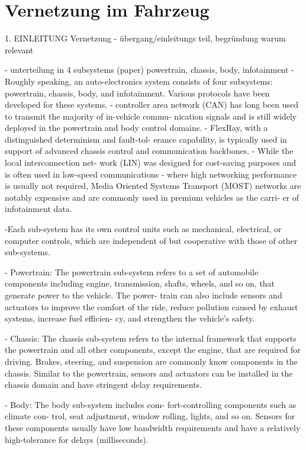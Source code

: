 \section{Vernetzung im Fahrzeug}

1. EINLEITUNG Vernetzung
- übergang/einleitungs teil, begründung warum relevant

- unterteilung in 4 subsystems (paper) powertrain, chassis, body, infotainment
- Roughly speaking, an auto-electronics system
consists of four subsystems: powertrain, chassis,
body, and infotainment. Various protocols have
been developed for these systems.
- controller area network (CAN) has long been
used to transmit the majority of in-vehicle commu-
nication signals and is still widely deployed in the
powertrain and body control domains.
- FlexRay, with a distinguished determinism and fault-tol-
erance capability, is typically used in support of
advanced chassis control and communication
backbones.
- While the local interconnection net-
work (LIN) was designed for cost-saving purposes
and is often used in low-speed communications
- where high networking performance is usually
not required, Media Oriented Systems Transport
(MOST) networks are notably expensive and are
commonly used in premium vehicles as the carri-
er of infotainment data.

-Each sub-system has its own control units such
as mechanical, electrical, or computer controls,
which are independent of but cooperative with
those of other sub-systems.

- Powertrain: The powertrain sub-system refers
to a set of automobile components including
engine, transmission, shafts, wheels, and so on,
that generate power to the vehicle. The power-
train can also include sensors and actuators to
improve the comfort of the ride, reduce pollution
caused by exhaust systems, increase fuel efficien-
cy, and strengthen the vehicle’s safety.

- Chassis: The chassis sub-system refers to the
internal framework that supports the powertrain
and all other components, except the engine,
that are required for driving. Brakes, steering, and
suspension are commonly know components in
the chassis. Similar to the powertrain, sensors and
actuators can be installed in the chassis domain
and have stringent delay requirements.

- Body: The body sub-system includes com-
fort-controlling components such as climate con-
trol, seat adjustment, window rolling, lights, and
so on. Sensors for these components usually have
low bandwidth requirements and have a relatively
high-tolerance for delays (milliseconds).

